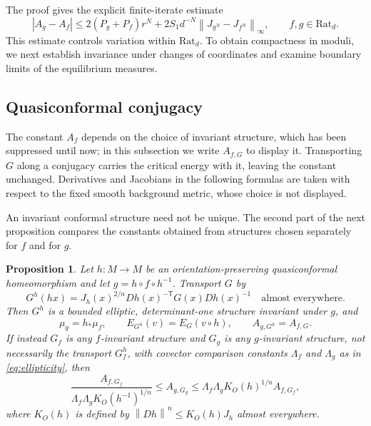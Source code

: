 \documentclass[10pt,a4paper]{amsart}
\newtheorem{proposition}[theorem]{Proposition}
\newcommand{\norm}[1]{\left\lVert #1\right\rVert}
\numberwithin{equation}{section}
\begin{document}
The proof gives the explicit finite-iterate estimate
\begin{equation}\label{eq:continuity-modulus}
 |A_g-A_f|\le 2(P_g+P_f)r^N
       +2S_1d^{-N}\norm{J_{g^N}-J_{f^N}}_\infty,
 \qquad f,g\in\mathrm{Rat}_d.
\end{equation}
This estimate controls variation within $\mathrm{Rat}_d$. To obtain compactness in moduli, we next establish invariance under changes of coordinates and examine boundary limits of the equilibrium measures.

\subsection{Quasiconformal conjugacy}

The constant $A_f$ depends on the choice of invariant structure, which has been suppressed until now; in this subsection we write $A_{f,G}$ to display it. Transporting $G$ along a conjugacy carries the critical energy with it, leaving the constant unchanged. Derivatives and Jacobians in the following formulas are taken with respect to the fixed smooth background metric, whose choice is not displayed.

An invariant conformal structure need not be unique. The second part of the next proposition compares the constants obtained from structures chosen separately for $f$ and for $g$.

\begin{proposition}\label{prop:qc-conjugacy}
Let $h\colon M\to M$ be an orientation-preserving quasiconformal homeomorphism and let $g=h\circ f\circ h^{-1}$. Transport $G$ by
\begin{equation}\label{eq:transported-G}
 G^h(hx)=J_h(x)^{2/n}Dh(x)^{-\mathsf T}G(x)Dh(x)^{-1}
 \quad\text{almost everywhere}.
\end{equation}
Then $G^h$ is a bounded elliptic, determinant-one structure invariant under $g$, and
\begin{equation}\label{eq:conjugacy-exact}
 \mu_g=h_*\mu_f,\qquad
 E_{G^h}(v)=E_G(v\circ h),\qquad
 A_{g,G^h}=A_{f,G}.
\end{equation}
If instead $G_f$ is any $f$-invariant structure and $G_g$ is any $g$-invariant structure, not necessarily the transport $G_f^h$, with covector comparison constants $\Lambda_f$ and $\Lambda_g$ as in \eqref{eq:ellipticity}, then
\begin{equation}\label{eq:conjugacy-comparison}
 \frac{A_{f,G_f}}{\Lambda_f\Lambda_g K_O(h^{-1})^{1/n}}
 \le A_{g,G_g}
 \le\Lambda_f\Lambda_g K_O(h)^{1/n}A_{f,G_f},
\end{equation}
where $K_O(h)$ is defined by $\norm{Dh}^n\le K_O(h)J_h$ almost everywhere.
\end{proposition}
\end{document}
